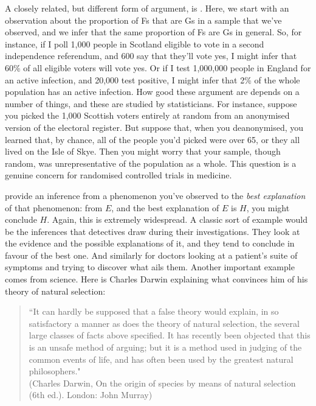 A closely related, but different form of argument, is . Here, we start with an observation about the proportion of Fs that are Gs in a sample that we've observed, and we infer that the same proportion of Fs are Gs in general. So, for instance, if I poll 1,000 people in Scotland eligible to vote in a second independence referendum, and 600 say that they'll vote yes, I might infer that 60\% of all eligible voters will vote yes. Or if I test 1,000,000 people in England for an active infection, and 20,000 test positive, I might infer that 2\% of the whole population has an active infection. How good these argument are depends on a number of things, and these are studied by statisticians. For instance, suppose you picked the 1,000 Scottish voters entirely at random from an anonymised version of the electoral register. But suppose that, when you deanonymised, you learned that, by chance, all of the people you'd picked were over 65, or they all lived on the Isle of Skye. Then you might worry that your sample, though random, was unrepresentative of the population as a whole. This question is a genuine concern for randomised controlled trials in medicine.

 provide an inference from a phenomenon you've observed to the \emph{best explanation} of that phenomenon: from $E$, and the best explanation of $E$ is $H$, you might conclude $H$. Again, this is extremely widespread. A classic sort of example would be the inferences that detectives draw during their investigations. They look at the evidence and the possible explanations of it, and they tend to conclude in favour of the best one. And similarly for doctors looking at a patient's suite of symptoms and trying to discover what ails them. Another important example comes from science. Here is Charles Darwin explaining what convinces him of his theory of natural selection:
\begin{quotation}
	``It can hardly be supposed that a false theory would explain, in so satisfactory a manner as does the theory of natural selection, the several large classes of facts above specified. It has recently been objected that this is an unsafe method of arguing; but it is a method used in judging of the common events of life, and has often been used by the greatest natural philosophers."\\ (Charles Darwin, On the origin of species by means of natural selection (6th ed.).
	London: John Murray)
\end{quotation}






